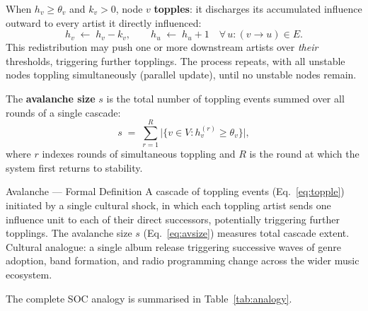 \documentclass[12pt, a4paper]{article}
\begin{document}
When $h_v \geq \theta_v$ and $k_v > 0$, node $v$ \textbf{topples}:
it discharges its accumulated influence outward to every artist
it directly influenced:
\begin{equation}
  h_v \;\leftarrow\; h_v - k_v, \qquad
  h_u \;\leftarrow\; h_u + 1 \quad
  \forall\, u : (v\!\to\!u)\in E.
  \label{eq:topple}
\end{equation}
This redistribution may push one or more downstream artists
over \textit{their} thresholds, triggering further topplings.
The process repeats, with all unstable nodes toppling
simultaneously (parallel update), until no unstable nodes remain.

The \textbf{avalanche size} $s$ is the total number of
toppling events summed over all rounds of a single cascade:
\begin{equation}
  s \;=\;
  \sum_{r=1}^{R}
  \bigl|\{v\in V : h_v^{(r)} \geq \theta_v\}\bigr|,
  \label{eq:avsize}
\end{equation}
where $r$ indexes rounds of simultaneous toppling and $R$ is
the round at which the system first returns to stability.

\begin{definitionbox}{Avalanche --- Formal Definition}
A cascade of toppling events (Eq.~\ref{eq:topple}) initiated by
a single cultural shock, in which each toppling artist sends
one influence unit to each of their direct successors,
potentially triggering further topplings.
The avalanche size $s$ (Eq.~\ref{eq:avsize}) measures total
cascade extent.
Cultural analogue: a single album release triggering successive
waves of genre adoption, band formation, and radio programming
change across the wider music ecosystem.
\end{definitionbox}

\medskip
The complete SOC analogy is summarised in Table~\ref{tab:analogy}.
\end{document}
